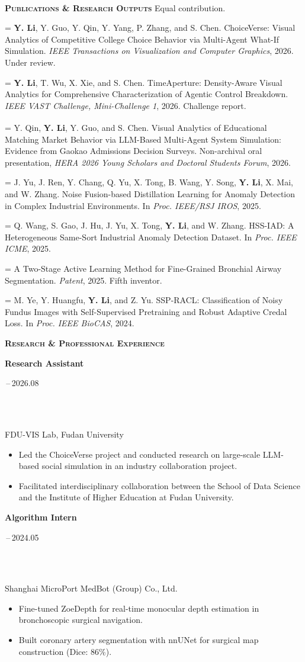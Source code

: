 \documentclass[10pt,a4paper]{article}
\newcommand{\bodyfont}{\fontsize{10.4pt}{13.35pt}\selectfont}
\newcommand{\smallfont}{\fontsize{9.7pt}{12.15pt}\selectfont}
\newcommand{\datefont}{\fontsize{9.6pt}{12.05pt}\selectfont\color{CVGray}}
\newcommand{\cvsection}[1]{%
  \Needspace{2.6\baselineskip}%
  \vspace{9pt}%
  {\fontsize{11.6pt}{13.8pt}\selectfont\bfseries\scshape #1}\par
  \vspace{\dimexpr-\baselineskip+2.8pt\relax}%
  \noindent{\color{CVRule}\rule{\textwidth}{0.32pt}}\par
  \vspace{5pt}%
}
\newcommand{\cvsectionnote}[2]{%
  \Needspace{2.6\baselineskip}%
  \vspace{9pt}%
  \noindent
  {\fontsize{11.6pt}{13.8pt}\selectfont\bfseries\scshape #1}%
  \hfill
  {\fontsize{8.8pt}{10.5pt}\selectfont\color{CVGray}#2}\par
  \vspace{\dimexpr-\baselineskip+2.8pt\relax}%
  \noindent{\color{CVRule}\rule{\textwidth}{0.32pt}}\par
  \vspace{5pt}%
}
\newcommand{\pairedline}[4]{%
  \noindent
  {\bodyfont\parbox[t]{\dimexpr\textwidth-44mm\relax}{\raggedright #1}}%
  \hfill
  {\datefont\parbox[t]{42mm}{\raggedleft #2}}%
  \par
  \ifx\\#3\\\else
    \vspace{0.15pt}%
    \noindent
    {\bodyfont\parbox[t]{\dimexpr\textwidth-44mm\relax}{\raggedright #3}}%
    \hfill
    {\datefont\parbox[t]{42mm}{\raggedleft #4}}%
    \par
  \fi
}
\newcommand{\entryline}[2]{%
  \pairedline{{\bfseries #1}}{#2}{}{}%
}
\newcommand{\expentry}[3]{%
  \Needspace{5.2\baselineskip}%
  \entryline{#1}{#2}%
  {\smallfont\color{CVGray}#3}\par
}
\newenvironment{cvitemsaftertwo}{%
  \begin{itemize}[leftmargin=1.22em,labelsep=0.42em,itemsep=2.35pt,topsep=0.65pt,parsep=0pt,partopsep=0pt]
  \bodyfont
}{\end{itemize}}
\newlength{\pubindent}
\newcommand{\publication}[2]{%
  \par\vspace{1.15pt}%
  {\fontsize{10.0pt}{12.6pt}\selectfont
   \hangindent=\pubindent
   \hangafter=1
   \noindent
   \makebox[\pubindent][l]{\makebox[6.5mm][r]{{\smallfont\color{CVGray}[#1]}}\hspace{2.7mm}}#2\par}%
}
\begin{document}
\cvsectionnote{Publications \& Research Outputs}{\textsuperscript{\dag} Equal contribution.}
\publication{1}{\textbf{Y. Li}, Y. Guo, Y. Qin, Y. Yang, P. Zhang, and S. Chen. ChoiceVerse: Visual Analytics of Competitive College Choice Behavior via Multi-Agent What-If Simulation. \textit{IEEE Transactions on Visualization and Computer Graphics}, 2026. Under review.}
\publication{2}{\textbf{Y. Li}, T. Wu, X. Xie, and S. Chen. TimeAperture: Density-Aware Visual Analytics for Comprehensive Characterization of Agentic Control Breakdown. \textit{IEEE VAST Challenge, Mini-Challenge 1}, 2026. Challenge report.}
\publication{3}{Y. Qin\textsuperscript{\dag}, \textbf{Y. Li}\textsuperscript{\dag}, Y. Guo, and S. Chen. Visual Analytics of Educational Matching Market Behavior via LLM-Based Multi-Agent System Simulation: Evidence from Gaokao Admissions Decision Surveys. Non-archival oral presentation, \textit{HERA 2026 Young Scholars and Doctoral Students Forum}, 2026.}
\publication{4}{J. Yu, J. Ren, Y. Chang, Q. Yu, X. Tong, B. Wang, Y. Song, \textbf{Y. Li}, X. Mai, and W. Zhang. Noise Fusion-based Distillation Learning for Anomaly Detection in Complex Industrial Environments. In \textit{Proc. IEEE/RSJ IROS}, 2025.}
\publication{5}{Q. Wang, S. Gao, J. Hu, J. Yu, X. Tong, \textbf{Y. Li}, and W. Zhang. HSS-IAD: A Heterogeneous Same-Sort Industrial Anomaly Detection Dataset. In \textit{Proc. IEEE ICME}, 2025.}
\publication{6}{A Two-Stage Active Learning Method for Fine-Grained Bronchial Airway Segmentation. \textit{Patent}, 2025. Fifth inventor.}
\publication{7}{M. Ye, Y. Huangfu, \textbf{Y. Li}, and Z. Yu. SSP-RACL: Classification of Noisy Fundus Images with Self-Supervised Pretraining and Robust Adaptive Credal Loss. In \textit{Proc. IEEE BioCAS}, 2024.}

\clearpage
\cvsection{Research \& Professional Experience}
\expentry{Research Assistant}{2025.09\,--\,2026.08}{FDU-VIS Lab, Fudan University}
\begin{cvitemsaftertwo}
  \item Led the ChoiceVerse project and conducted research on large-scale LLM-based social simulation in an industry collaboration project.
  \item Facilitated interdisciplinary collaboration between the School of Data Science and the Institute of Higher Education at Fudan University.
\end{cvitemsaftertwo}
\vspace{3.0pt}
\expentry{Algorithm Intern}{2023.09\,--\,2024.05}{Shanghai MicroPort MedBot (Group) Co., Ltd.}
\begin{cvitemsaftertwo}
  \item Fine-tuned ZoeDepth for real-time monocular depth estimation in bronchoscopic surgical navigation.
  \item Built coronary artery segmentation with nnUNet for surgical map construction (Dice: 86\%).
\end{cvitemsaftertwo}
\end{document}
